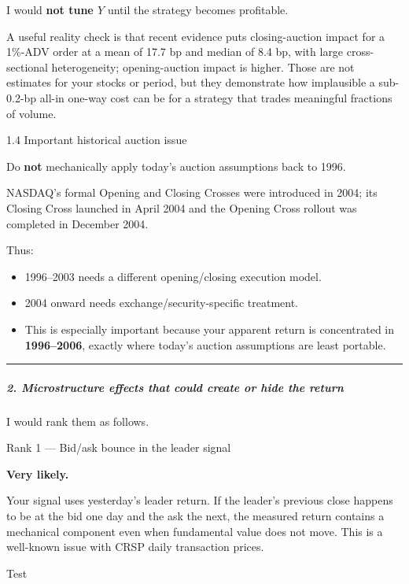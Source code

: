 I would \textbf{not tune \(Y\)} until the strategy becomes profitable.

A useful reality check is that recent evidence puts closing-auction impact for a 1\%-ADV order at a mean of 17.7 bp and median of 8.4 bp, with large cross-sectional heterogeneity; opening-auction impact is higher. Those are not estimates for your stocks or period, but they demonstrate how implausible a sub-0.2-bp all-in one-way cost can be for a strategy that trades meaningful fractions of volume.

1.4 Important historical auction issue

Do \textbf{not} mechanically apply today's auction assumptions back to 1996.

NASDAQ's formal Opening and Closing Crosses were introduced in 2004; its Closing Cross launched in April 2004 and the Opening Cross rollout was completed in December 2004.

Thus:

\begin{itemize}
\tightlist
\item
  1996--2003 needs a different opening/closing execution model.
\item
  2004 onward needs exchange/security-specific treatment.
\item
  This is especially important because your apparent return is concentrated in \textbf{1996--2006}, exactly where today's auction assumptions are least portable.
\end{itemize}

\begin{center}\rule{0.5\linewidth}{0.5pt}\end{center}

\hypertarget{microstructure-effects-that-could-create-or-hide-the-return}{%
\subparagraph{2. Microstructure effects that could create or hide the return}\label{microstructure-effects-that-could-create-or-hide-the-return}}

I would rank them as follows.

Rank 1 --- Bid/ask bounce in the leader signal

\textbf{Very likely.}

Your signal uses yesterday's leader return. If the leader's previous close happens to be at the bid one day and the ask the next, the measured return contains a mechanical component even when fundamental value does not move. This is a well-known issue with CRSP daily transaction prices.

Test

